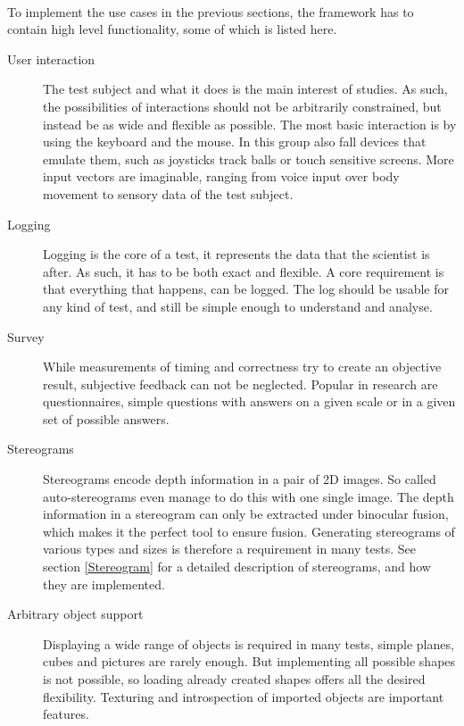 \paragraph{}
To implement the use cases in the previous sections, the framework has to contain high level functionality, some of which is listed here.

\begin{description}
\item[User interaction]
The test subject and what it does is the main interest of studies.
As such, the possibilities of interactions should not be arbitrarily constrained, but instead be as wide and flexible as possible.
The most basic interaction is by using the keyboard and the mouse.
In this group also fall devices that emulate them, such as joysticks track balls or touch sensitive screens.
More input vectors are imaginable, ranging from voice input over body movement to sensory data of the test subject.

\item[Logging]
Logging is the core of a test, it represents the data that the scientist is after.
As such, it has to be both exact and flexible.
A core requirement is that everything that happens, can be logged.
The log should be usable for any kind of test, and still be simple enough to understand and analyse.

\item[Survey]
While measurements of timing and correctness try to create an objective result, subjective feedback can not be neglected.
Popular in research are questionnaires, simple questions with answers on a given scale or in a given set of possible answers.

\item[Stereograms]
Stereograms encode depth information in a pair of 2D images.
So called auto-stereograms even manage to do this with one single image.
The depth information in a stereogram can only be extracted under binocular fusion, which makes it the perfect tool to ensure fusion.
Generating stereograms of various types and sizes is therefore a requirement in many tests.
See section \ref{Stereogram} for a detailed description of stereograms, and how they are implemented.

\item[Arbitrary object support]
Displaying a wide range of objects is required in many tests, simple planes, cubes and pictures are rarely enough.
But implementing all possible shapes is not possible, so loading already created shapes offers all the desired flexibility.
Texturing and introspection of imported objects are important features.


\end{description}
